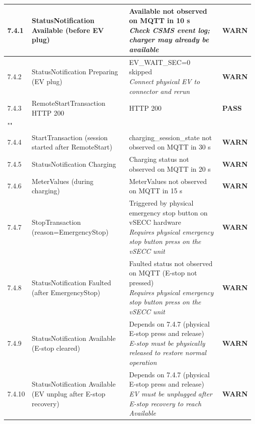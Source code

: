 \documentclass[10pt, a4paper]{article}
\begin{document}
\begin{longtable}{|L{1cm}|L{5.5cm}|M{7cm}|C{1.8cm}|}
\hline
\small 7.4.1 & \small StatusNotification Available (before EV plug) & Available not observed on MQTT in 10 s{\newline\normalfont\footnotesize\itshape Check CSMS event log; charger may already be available} & \textcolor{warnorange}{\textbf{WARN}} \\
\hline
\small 7.4.2 & \small StatusNotification Preparing (EV plug) & EV\_WAIT\_SEC=0  skipped{\newline\normalfont\footnotesize\itshape Connect physical EV to connector and rerun} & \textcolor{warnorange}{\textbf{WARN}} \\
\hline
\small 7.4.3 & \small RemoteStartTransaction  HTTP 200 & HTTP 200 & \textcolor{passgreen}{\textbf{PASS}} \\
\hline
{} \\
\hline
\small 7.4.4 & \small StartTransaction (session started after RemoteStart) & charging\_session\_state not observed on MQTT in 30 s & \textcolor{warnorange}{\textbf{WARN}} \\
\hline
\small 7.4.5 & \small StatusNotification Charging & Charging status not observed on MQTT in 20 s & \textcolor{warnorange}{\textbf{WARN}} \\
\hline
\small 7.4.6 & \small MeterValues (during charging) & MeterValues not observed on MQTT in 15 s & \textcolor{warnorange}{\textbf{WARN}} \\
\hline
\small 7.4.7 & \small StopTransaction (reason=EmergencyStop) & Triggered by physical emergency stop button on vSECC hardware{\newline\normalfont\footnotesize\itshape Requires physical emergency stop button press on the vSECC unit} & \textcolor{warnorange}{\textbf{WARN}} \\
\hline
\small 7.4.8 & \small StatusNotification Faulted (after EmergencyStop) & Faulted status not observed on MQTT (E-stop not pressed){\newline\normalfont\footnotesize\itshape Requires physical emergency stop button press on the vSECC unit} & \textcolor{warnorange}{\textbf{WARN}} \\
\hline
\small 7.4.9 & \small StatusNotification Available (E-stop cleared) & Depends on 7.4.7 (physical E-stop press and release){\newline\normalfont\footnotesize\itshape E-stop must be physically released to restore normal operation} & \textcolor{warnorange}{\textbf{WARN}} \\
\hline
\small 7.4.10 & \small StatusNotification Available (EV unplug after E-stop recovery) & Depends on 7.4.7 (physical E-stop press and release){\newline\normalfont\footnotesize\itshape EV must be unplugged after E-stop recovery to reach Available} & \textcolor{warnorange}{\textbf{WARN}} \\

\end{longtable}
\end{document}
